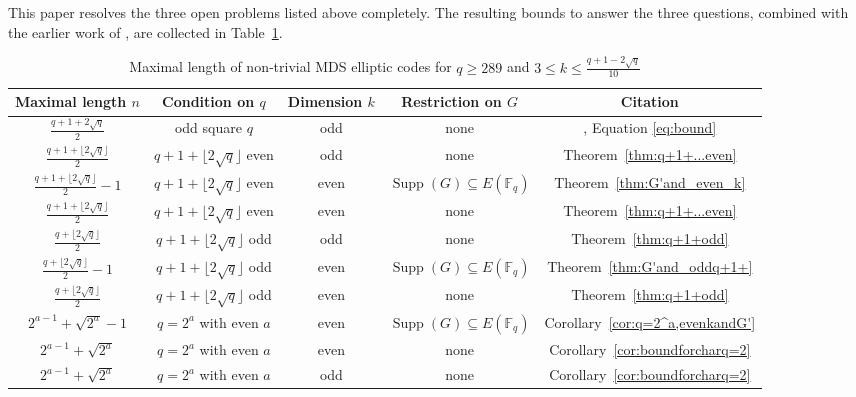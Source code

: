 \documentclass[journal,12pt,onecolumn]{IEEEtran}
\begin{document}
This paper resolves the three open problems listed above completely. The resulting bounds to answer the three questions, combined with the earlier work of \cite{MR4564628}, are collected in Table~\ref{tab:MEC_max_length}.
\begin{table}[htbp]
  \centering
  \caption{Maximal length of non‑trivial MDS elliptic codes for $q \ge 289$ and $3 \le k \le \frac{q+1-2\sqrt{q}}{10}$}
  \label{tab:MEC_max_length}
  \renewcommand{\arraystretch}{1.6}
  \begin{tabular}{|c|c|c|c|c|}
    \hline
    \textbf{Maximal length} $n$ & \textbf{Condition on} $q$ & \textbf{Dimension} $k$ & \textbf{Restriction on} $G$ & \textbf{Citation} \\
    \hline
    $\frac{q+1+ 2\sqrt{q}}{2}$ & odd square $q$ & odd & none & \cite{MR4564628}, Equation \eqref{eq:bound} \\
    \hline
    $\frac{q+1+ \lfloor 2\sqrt{q}\rfloor}{2}$ & $q+1+ \lfloor 2\sqrt{q}\rfloor$ even & odd & none & Theorem~\ref{thm:q+1+...even} \\
    \hline
    $\frac{q+1+ \lfloor 2\sqrt{q}\rfloor}{2}-1$ & $q+1+ \lfloor 2\sqrt{q}\rfloor$ even & even & $\operatorname{Supp}(G) \subseteq E(\mathbb{F}_q)$ & Theorem~\ref{thm:G'and_even_k} \\
    \hline
    $\frac{q+1+ \lfloor 2\sqrt{q}\rfloor}{2}$ & $q+1+ \lfloor 2\sqrt{q}\rfloor$ even & even & none & Theorem~\ref{thm:q+1+...even} \\
    \hline
    $\frac{q+ \lfloor 2\sqrt{q}\rfloor}{2}$ & $q+1+ \lfloor 2\sqrt{q}\rfloor$ odd & odd & none & Theorem~\ref{thm:q+1+odd} \\
    \hline
    $\frac{q+ \lfloor 2\sqrt{q}\rfloor}{2}-1$ & $q+1+ \lfloor 2\sqrt{q}\rfloor$ odd & even & $\operatorname{Supp}(G) \subseteq E(\mathbb{F}_q)$ & Theorem~\ref{thm:G'and_oddq+1+} \\
    \hline
    $\frac{q+ \lfloor 2\sqrt{q}\rfloor}{2}$ & $q+1+ \lfloor 2\sqrt{q}\rfloor$ odd & even & none & Theorem~\ref{thm:q+1+odd} \\
    \hline
    $2^{a-1} + \sqrt{2^a} - 1$ & $q=2^a$ with even $a$ & even & $\operatorname{Supp}(G) \subseteq E(\mathbb{F}_q)$ & Corollary~\ref{cor:q=2^a,evenkandG'} \\
    \hline
    $2^{a-1} + \sqrt{2^a} $ & $q=2^a$ with even $a$ & even & none & Corollary~\ref{cor:boundforcharq=2} \\
    \hline
    $2^{a-1} + \sqrt{2^a} $ & $q=2^a$ with even $a$ & odd & none & Corollary~\ref{cor:boundforcharq=2} \\
    \hline
  \end{tabular}
\end{table}
\end{document}
